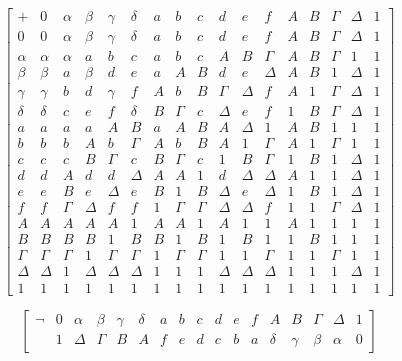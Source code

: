 \begin{enumerate}
  \[\begin{bmatrix}
   + & 0 & \alpha & \beta & \gamma & \delta & a & b & c & d & e & f & Α & Β & \Gamma & \Delta & 1 \\
  0 & 0 & \alpha & \beta & \gamma & \delta & a & b & c & d & e & f & Α & Β & \Gamma & \Delta & 1 \\
  \alpha & \alpha & \alpha & a & b & c & a & b & c & Α & Β & \Gamma & Α & Β & \Gamma & 1 & 1 \\
  \beta & \beta & a & \beta & d & e & a & Α & Β & d & e & \Delta & Α & Β & 1 & \Delta & 1 \\
  \gamma & \gamma & b & d & \gamma & f & Α & b & Β & \Gamma & \Delta & f & Α & 1 & \Gamma & \Delta & 1 \\
  \delta & \delta & c & e & f & \delta & Β & \Gamma & c & \Delta & e & f & 1 & Β & \Gamma & \Delta & 1 \\
  a & a & a & a & Α & Β & a & Α & Β & Α & \Delta & 1 & Α & Β & 1 & 1 & 1 \\
  b & b & b & Α & b & \Gamma & Α & b & Β & Α & 1 & \Gamma & Α & 1 & \Gamma & 1 & 1 \\
  c & c & c & Β & \Gamma & c & Β & \Gamma & c & 1 & Β & \Gamma & 1 & Β & 1 & \Delta & 1 \\
  d & d & Α & d & d & \Delta & Α & Α & 1 & d & \Delta & \Delta & Α & 1 & 1 & \Delta & 1 \\
  e & e & Β & e & \Delta & e & Β & 1 & Β & \Delta & e & \Delta & 1 & Β & 1 & \Delta & 1 \\
  f & f & \Gamma & \Delta & f & f & 1 & \Gamma & \Gamma & \Delta & \Delta & f & 1 & 1 & \Gamma & \Delta & 1 \\
  Α & Α & Α & Α & Α & 1 & Α & Α & 1 & Α & 1 & 1 & Α & 1 & 1 & 1 & 1 \\
  Β & Β & Β & Β & 1 & Β & Β & 1 & Β & 1 & Β & 1 & 1 & Β & 1 & 1 & 1 \\
  \Gamma & \Gamma & \Gamma & 1 & \Gamma & \Gamma & 1 & \Gamma & \Gamma & 1 & 1 & \Gamma & 1 & 1 & \Gamma & 1 & 1 \\
  \Delta & \Delta & 1 & \Delta & \Delta & \Delta & 1 & 1 & 1 & \Delta & \Delta & \Delta & 1 & 1 & 1 & \Delta & 1 \\
  1 & 1 & 1 & 1 & 1 & 1 & 1 & 1 & 1 & 1 & 1 & 1 & 1 & 1 & 1 & 1 & 1
  \end{bmatrix}\]
\end{enumerate}

\[\begin{bmatrix}
\neg & 0 & \alpha & \beta & \gamma & \delta & a & b & c & d & e & f & Α & Β & \Gamma & \Delta & 1 \\
 & 1 & \Delta & \Gamma & Β & Α & f & e & d & c & b & a & \delta & \gamma & \beta & \alpha & 0
\end{bmatrix}\]

